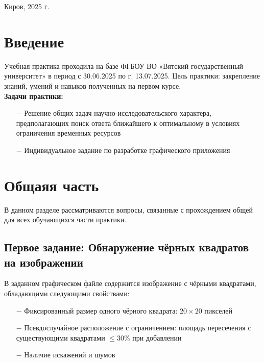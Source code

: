 \documentclass[oneside,a4paper,14pt]{extarticle}
\begin{document}
\vspace{4cm}

\begin{center}
    Киров, 2025 г.
\end{center}

\newpage
\tableofcontents
\thispagestyle{plain}

\clearpage

\section{Введение}


Учебная практика проходила на базе ФГБОУ ВО «Вятский государственный университет» в период с 30.06.2025 по г. 13.07.2025.
Цель практики: закрепление знаний, умений и навыков полученных на первом курсе.\\
\textbf{Задачи практики:}
\begin{itemize}
  \item[$-$] Решение общих задач научно-исследовательского характера, предполагающих поиск ответа ближайшего к оптимальному в условиях ограничения временных ресурсов
  \item[$-$] Индивидуальное задание по разработке графического приложения
\end{itemize}

\clearpage

\section{Общаяя часть}

В данном разделе рассматриваются вопросы, связанные с прохождением общей для всех обучающихся части практики.

\subsection{Первое задание: Обнаружение чёрных квадратов на изображении}

\sloppy В заданном графическом файле содержится изображение с чёрными квадратами, обладающими следующими свойствами:

\begin{itemize}
    \item[$-$] Фиксированный размер одного чёрного квадрата: $20\times20$ пикселей
    \item[$-$] Псевдослучайное расположение с ограничением: площадь пересечения с существующими квадратами $\leq 30\%$ при добавлении
    \item[$-$] Наличие искажений и шумов
\end{itemize}
\end{document}
